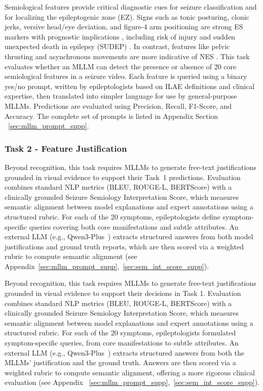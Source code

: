 \documentclass{article}
\theoremstyle{plain}
\theoremstyle{definition}
\theoremstyle{remark}
\begin{document}
Semiological features provide critical diagnostic cues for seizure classification and for localizing the epileptogenic zone (EZ). Signs such as tonic posturing, clonic jerks, versive head/eye deviation, and figure-4 arm positioning are strong ES markers with prognostic implications \cite{Loddenkemper2005Lateralizing}, including risk of injury and sudden unexpected death in epilepsy (SUDEP) \cite{harden2017sudep}. In contrast, features like pelvic thrusting and asynchronous movements are more indicative of NES \cite{Perez2016NonepilepticSeizures}. This task evaluates whether an MLLM can detect the presence or absence of 20 core semiological features in a seizure video. Each feature is queried using a binary yes/no prompt, written by epileptologists based on ILAE definitions and clinical expertise, then translated into simpler language for use by general-purpose MLLMs. Predictions are evaluated using Precision, Recall, F1-Score, and Accuracy. The complete set of prompts is listed in Appendix Section ~\ref{sec:mllm_prompt_supp}.


\subsubsection{Task 2 - Feature Justification}
\label{subsubsec:tasks2_metrics}

Beyond recognition, this task requires MLLMs to generate free-text justifications grounded in visual evidence to support their Task~1 predictions. Evaluation combines standard NLP metrics (BLEU, ROUGE-L, BERTScore) with a clinically grounded Seizure Semiology Interpretation Score, which measures semantic alignment between model explanations and expert annotations using a structured rubric. For each of the 20 symptoms, epileptologists define symptom-specific queries covering both core manifestations and subtle attributes. An external LLM (e.g., Qwen3-Plus~\cite{yang2025qwen3}) extracts structured answers from both model justifications and ground truth reports, which are then scored via a weighted rubric to compute semantic alignment (see Appendix~\ref{sec:mllm_prompt_supp},~\ref{sec:sem_int_score_supp}).

\iffalse
Beyond recognition, this task requires MLLMs to generate free-text justifications grounded in visual evidence to support their decisions in Task 1. Evaluation combines standard NLP metrics (BLEU, ROUGE-L, BERTScore) with a clinically grounded Seizure Semiology Interpretation Score, which measures semantic alignment between model explanations and expert annotations using a structured rubric. For each of the 20 symptoms, epileptologists formulated symptom-specific queries, from core manifestations to subtle attributes. An external LLM (e.g., Qwen3-Plus~\cite{yang2025qwen3}) extracts structured answers from both the MLLMs' justification and the ground truth. Answers are then scored via a weighted rubric to compute semantic alignment, offering a more rigorous clinical evaluation (see Appendix ~\ref{sec:mllm_prompt_supp},~\ref{sec:sem_int_score_supp}).
\end{document}
